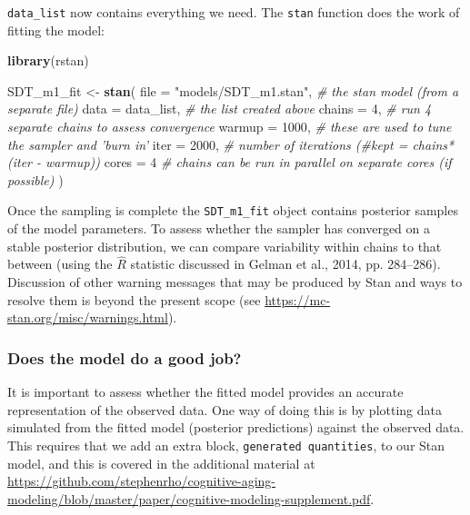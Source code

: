 \documentclass[
  english,
  ,man,floatsintext]{apa6}
\newenvironment{Shaded}{\begin{snugshade}}{\end{snugshade}}
\newcommand{\CommentTok}[1]{\textcolor[rgb]{0.56,0.35,0.01}{\textit{#1}}}
\newcommand{\DataTypeTok}[1]{\textcolor[rgb]{0.13,0.29,0.53}{#1}}
\newcommand{\DecValTok}[1]{\textcolor[rgb]{0.00,0.00,0.81}{#1}}
\newcommand{\KeywordTok}[1]{\textcolor[rgb]{0.13,0.29,0.53}{\textbf{#1}}}
\newcommand{\NormalTok}[1]{#1}
\newcommand{\StringTok}[1]{\textcolor[rgb]{0.31,0.60,0.02}{#1}}
\begin{document}
\texttt{data\_list} now contains everything we need. The \texttt{stan} function does the work of fitting the model:

\begin{Shaded}
\begin{Highlighting}[]
\KeywordTok{library}\NormalTok{(rstan)}

\NormalTok{SDT_m1_fit <-}\StringTok{ }\KeywordTok{stan}\NormalTok{(}
  \DataTypeTok{file =} \StringTok{"models/SDT_m1.stan"}\NormalTok{, }\CommentTok{# the stan model (from a separate file)}
  \DataTypeTok{data =}\NormalTok{ data_list, }\CommentTok{# the list created above}
  \DataTypeTok{chains =} \DecValTok{4}\NormalTok{, }\CommentTok{# run 4 separate chains to assess convergence}
  \DataTypeTok{warmup =} \DecValTok{1000}\NormalTok{, }\CommentTok{# these are used to tune the sampler and 'burn in'}
  \DataTypeTok{iter =} \DecValTok{2000}\NormalTok{, }\CommentTok{# number of iterations (#kept = chains*(iter - warmup))}
  \DataTypeTok{cores =} \DecValTok{4} \CommentTok{# chains can be run in parallel on separate cores (if possible)}
\NormalTok{)}
\end{Highlighting}
\end{Shaded}

Once the sampling is complete the \texttt{SDT\_m1\_fit} object contains posterior samples of the model parameters. To assess whether the sampler has converged on a stable posterior distribution, we can compare variability within chains to that between (using the \(\hat{R}\) statistic discussed in Gelman et al., 2014, pp. 284--286). Discussion of other warning messages that may be produced by Stan and ways to resolve them is beyond the present scope (see \url{https://mc-stan.org/misc/warnings.html}).

\hypertarget{does-the-model-do-a-good-job}{%
\subsubsection{Does the model do a good job?}\label{does-the-model-do-a-good-job}}

It is important to assess whether the fitted model provides an accurate representation of the observed data. One way of doing this is by plotting data simulated from the fitted model (posterior predictions) against the observed data. This requires that we add an extra block, \texttt{generated\ quantities}, to our Stan model, and this is covered in the additional material at \url{https://github.com/stephenrho/cognitive-aging-modeling/blob/master/paper/cognitive-modeling-supplement.pdf}.
\end{document}
